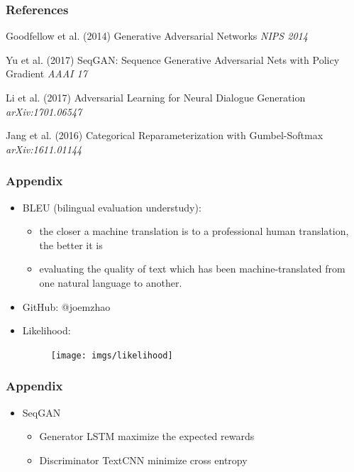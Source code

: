 \documentclass{beamer}
\begin{document}
\begin{frame}
\frametitle{References}
\footnotesize{
\begin{thebibliography}{99} %
 Goodfellow et al. (2014)
\newblock Generative Adversarial Networks
\newblock \emph{NIPS 2014}

 Yu et al. (2017)
\newblock SeqGAN: Sequence Generative Adversarial Nets with Policy Gradient 
\newblock \emph{AAAI 17}

 Li et al. (2017)
\newblock Adversarial Learning for Neural Dialogue Generation
\newblock \emph{arXiv:1701.06547}

 Jang et al. (2016)
\newblock Categorical Reparameterization with Gumbel-Softmax
\newblock \emph{arXiv:1611.01144}


\end{thebibliography}
}
\end{frame}


\begin{frame}
\frametitle{Appendix}
\begin{itemize}
\item BLEU (bilingual evaluation understudy):
	\begin{itemize}
 		\item the closer a machine translation is to a professional human translation, the better it is
 		\item evaluating the quality of text which has been machine-translated from one natural language to another. 
 	\end{itemize}
 \item GitHub: @joemzhao
 \item Likelihood:
		 \begin{figure}
			\centering
			\texttt{[image: imgs/likelihood]}
		\end{figure}
\end{itemize}
\end{frame}

\begin{frame}
\frametitle{Appendix}
\begin{itemize}
\item SeqGAN 
\begin{itemize}
		\item Generator LSTM maximize the expected rewards
		\item Discriminator TextCNN minimize cross entropy
\end{itemize}
\end{itemize}
\end{frame}
\end{document}
